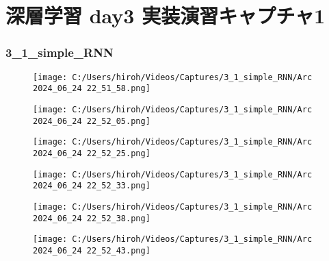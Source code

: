\documentclass{ltjsarticle}
\begin{document}
\part{深層学習 day3 実装演習キャプチャ1}
\section{3\_1\_simple\_RNN}
\begin{figure}[htbp]
  \centering
  \texttt{[image: C:/Users/hiroh/Videos/Captures/3\_1\_simple\_RNN/Arc 2024\_06\_24 22\_51\_58.png]}
\end{figure}
\begin{figure}[htbp]
  \centering
  \texttt{[image: C:/Users/hiroh/Videos/Captures/3\_1\_simple\_RNN/Arc 2024\_06\_24 22\_52\_05.png]}
\end{figure}
\begin{figure}[htbp]
  \centering
  \texttt{[image: C:/Users/hiroh/Videos/Captures/3\_1\_simple\_RNN/Arc 2024\_06\_24 22\_52\_25.png]}
\end{figure}
\begin{figure}[htbp]
  \centering
  \texttt{[image: C:/Users/hiroh/Videos/Captures/3\_1\_simple\_RNN/Arc 2024\_06\_24 22\_52\_33.png]}
\end{figure}
\begin{figure}[htbp]
  \centering
  \texttt{[image: C:/Users/hiroh/Videos/Captures/3\_1\_simple\_RNN/Arc 2024\_06\_24 22\_52\_38.png]}
\end{figure}
\begin{figure}[htbp]
  \centering
  \texttt{[image: C:/Users/hiroh/Videos/Captures/3\_1\_simple\_RNN/Arc 2024\_06\_24 22\_52\_43.png]}
\end{figure}

\clearpage
\end{document}
